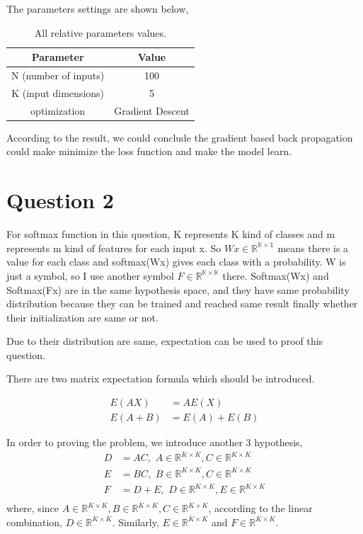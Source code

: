 \documentclass[12pt,letterpaper]{article}
\begin{document}
The parameters settings are shown below,
\begin{table}[h]
        \centering
        \vspace{\baselineskip}
        \caption{All relative parameters values.}\label{T:parameters}
      \begin{tabular}{cc}
        \hline
        Parameter & Value\\
        \hline
        N (number of inputs) & 100\\
        K (input dimensions) & 5\\
        optimization & Gradient Descent\\
        \hline
      \end{tabular}
\end{table}

According to the result, we could conclude the gradient based back propagation could make minimize the loss function and make the model learn.

\newpage
\section{Question 2}

For softmax function in this question, K represents K kind of classes and m represents m kind of features for each input x. So $Wx \in \mathbb{R^{K \times 1}}$ means there is a value for each class and softmax(Wx) gives each class with a probability. W is just a symbol, so I use another symbol $F \in \mathbb{R^{K \times K}}$ there. Softmax(Wx) and Softmax(Fx) are in the same hypothesis space, and they have same probability distribution because they can be trained and reached same result finally whether their initialization are same or not.

Due to their distribution are same, expectation can be used to proof this question.

There are two matrix expectation formula which should be introduced.

\begin{align*}
    E(AX) &= AE(X) \\
    E(A+B) &= E(A) + E(B)
\end{align*}

In order to proving the problem, we introduce another $3$ hypothesis,
\begin{align*}
    D &= AC, \,\, A \in \mathbb{R}^{K \times K},  C \in \mathbb{R}^{K \times K}\\
    E &= BC, \,\, B \in \mathbb{R}^{K \times K},  C \in \mathbb{R}^{K \times K}\\
    F &= D + E, \,\, D \in \mathbb{R}^{K \times K},  E \in \mathbb{R}^{K \times K}\\
\end{align*}
where, since $ A \in \mathbb{R}^{K \times K},  B \in \mathbb{R}^{K \times K}, C \in \mathbb{R}^{K \times K}$, according to the linear combination, $D \in \mathbb{R}^{K \times K}$. Similarly, $E \in \mathbb{R}^{K \times K}$ and $F \in \mathbb{R}^{K \times K}$.
\end{document}
